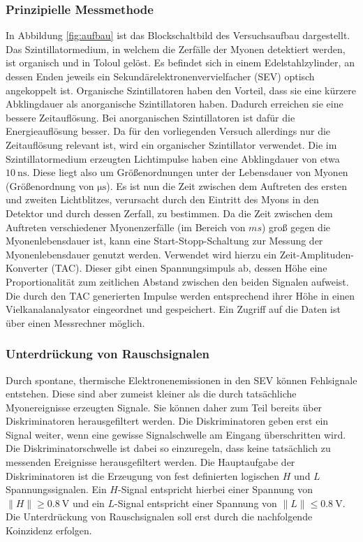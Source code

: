 \subsubsection{Prinzipielle Messmethode}
In Abbildung \ref{fig:aufbau} ist das Blockschaltbild des Versuchsaufbau dargestellt.
Das Szintillatormedium, in welchem die Zerfälle der Myonen detektiert werden, ist organisch und in Toloul gelöst. Es befindet sich in einem Edelstahlzylinder, an dessen Enden jeweils ein Sekundärelektronenvervielfacher (SEV) optisch angekoppelt ist.
Organische Szintillatoren haben den Vorteil, dass sie eine kürzere Abklingdauer als anorganische Szintillatoren haben. Dadurch erreichen sie eine bessere Zeitauflösung. Bei anorganischen Szintillatoren ist dafür die Energieauflösung besser. Da für den vorliegenden Versuch allerdings  nur die Zeitauflösung relevant ist, wird ein organischer Szintillator verwendet.
Die im Szintillatormedium erzeugten Lichtimpulse haben eine Abklingdauer von etwa $\SI{10}{\nano\second}$. Diese liegt also um Größenordnungen unter der Lebensdauer von Myonen (Größenordnung von $\si{\micro\second}$).
Es ist nun die Zeit zwischen dem Auftreten des ersten und zweiten Lichtblitzes, verursacht durch den Eintritt des Myons in den Detektor und durch dessen Zerfall, zu bestimmen.
Da die Zeit zwischen dem Auftreten verschiedener Myonenzerfälle (im Bereich von $\si{ms}$) groß gegen die Myonenlebensdauer ist, kann eine Start-Stopp-Schaltung zur Messung der Myonenlebensdauer genutzt werden.
Verwendet wird hierzu ein Zeit-Amplituden-Konverter (TAC). Dieser gibt einen Spannungsimpuls ab, dessen Höhe eine Proportionalität zum zeitlichen Abstand zwischen den beiden Signalen aufweist.
Die durch den TAC generierten Impulse werden entsprechend ihrer Höhe in einen Vielkanalanalysator eingeordnet und gespeichert. Ein Zugriff auf die Daten ist über einen Messrechner möglich.
\subsubsection{Unterdrückung von Rauschsignalen}
Durch spontane, thermische Elektronenemissionen in den SEV können Fehlsignale entstehen.
Diese sind aber zumeist kleiner als die durch tatsächliche Myonereignisse erzeugten Signale.
Sie können daher zum Teil bereits über Diskriminatoren herausgefiltert werden.
Die Diskriminatoren geben erst ein Signal weiter, wenn eine gewisse Signalschwelle am Eingang überschritten wird.
Die Diskriminatorschwelle ist dabei so einzuregeln, dass keine tatsächlich zu messenden Ereignisse herausgefiltert werden.
Die Hauptaufgabe der Diskriminatoren ist die Erzeugung von fest definierten logischen $H$ und $L$ Spannungssignalen.
Ein $H$-Signal entspricht hierbei einer Spannung von $\|H\|\geq \SI{0.8}{\volt}$ und ein $L$-Signal entspricht einer Spannung von $\|L\|\leq\SI{0.8}{\volt}$.
Die Unterdrückung von Rauschsignalen soll erst durch die nachfolgende Koinzidenz erfolgen.

